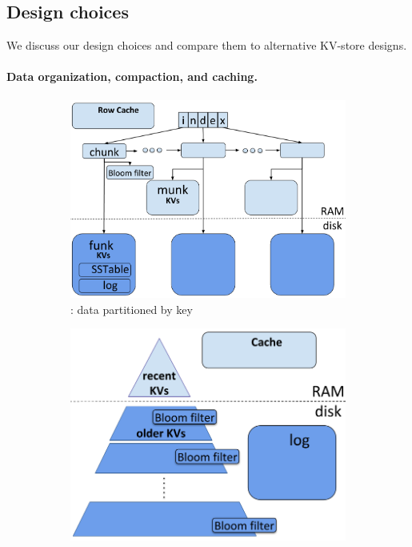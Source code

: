 \subsection{Design choices}

We discuss our design choices and compare them to alternative KV-store designs.


\paragraph{Data organization, compaction, and caching.}


\begin{figure}[tb]
\begin{subfigure}{0.34\linewidth}
\includegraphics[width=\columnwidth]{PiWi.png}
\caption{\sys: data partitioned by key}
\label{fig:piwi}
\end{subfigure}
\hspace{1mm}
\begin{subfigure}{0.3\linewidth}
\includegraphics[width=\textwidth]{LSM.png}

\end{subfigure}
\end{figure}
